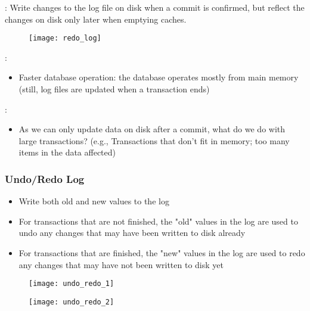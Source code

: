  : Write changes to the log file on disk when a commit is confirmed, but reflect the changes on disk only later when emptying caches.

\begin{figure}[H]
    \centering
    \texttt{[image: redo\_log]}
\end{figure}

\begin{minipage}{0.48\textwidth}
 :
\begin{itemize}
    \item Faster database operation: the database operates mostly from main memory (still, log files are updated when a transaction ends)
\end{itemize}
\end{minipage}
\hfill
\begin{minipage}{0.48\textwidth}
 :
\begin{itemize}
    \item As we can only update data on disk after a commit, what do we do with large transactions? (e.g., Transactions that don’t fit in memory; too many items in the data affected)
\end{itemize}
\end{minipage}

\subsubsection{Undo/Redo Log}

\begin{itemize}
    \item Write both old and new values to the log
    \item For transactions that are not finished, the "old" values in the log are used to undo any changes that may have been written to disk already
    \item For transactions that are finished, the "new" values in the log are used to redo any changes that may have not been written to disk yet
\end{itemize}

\begin{minipage}{0.48\textwidth}
    \begin{figure}[H]
        \centering
        \texttt{[image: undo\_redo\_1]}
    \end{figure}
\end{minipage}
\hfill
\begin{minipage}{0.48\textwidth}
    \begin{figure}[H]
        \centering
        \texttt{[image: undo\_redo\_2]}
    \end{figure}
\end{minipage}

